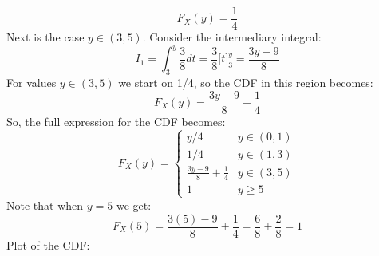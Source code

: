 $$
F_X(y) = \frac{1}{4}
$$
Next is the case $y\in(3,5)$. Consider the intermediary integral:
$$
I_1= \int_3^y\frac{3}{8}dt
= \frac{3}{8}\Big[t\Big]_3^y
= \frac{3y - 9}{8}
$$
For values $y\in(3,5)$ we start on 1/4, so the CDF in this region becomes:
$$
F_X(y) = \frac{3y - 9}{8} + \frac{1}{4}
$$
\newpage\noindent
So, the full expression for the CDF becomes:
$$
F_X(y) =
\left\{
    \begin{matrix}
        \displaystyle y/4 & y\in(0,1) \\
        1/4 & y\in(1,3) \\
        \displaystyle \frac{3y - 9}{8} + \frac{1}{4} & y\in(3,5) \\
        1 & y\geq 5
    \end{matrix}
\right.
$$
Note that when $y = 5$ we get:
$$
F_X(5) = \frac{3(5) - 9}{8} + \frac{1}{4} = \frac{6}{8} + \frac{2}{8} = 1
$$
Plot of the CDF:
\begin{center}
\end{center}
